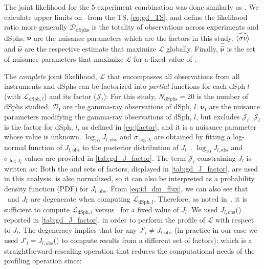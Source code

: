 The joint likelihood for the 5-experiment combination was done similarly as .
We calculate upper limits on \sv~from the TS, \cref{eq:gd_TS}, and define the likelihood ratio more generally
\gdLHratio
$\bm{\mathcal{D}_{\mathrm{dSphs}}}$ is the totality of observations across experiments and dSphs.
$\bm{\nu}$ are the nuisance parameters which are the \J factors in this study.
$\widehat{\langle \sigma \mathit{v} \rangle}$ and $\hat{\bm{\nu}}$ are the respective estimate that maximize $\mathcal{L}$ globally.
Finally, $\hat{\hat{\bm{\nu}}}$ is the set of nuisance parameters that maximize $\mathcal{L}$ for a fixed value of \sv.

The \textit{complete} joint likelihood, $\mathcal{L}$ that encompasses all observations from all instruments and dSphs can be factorized into \textit{partial} functions for each dSph $l$ (with $\mathcal{L}_{\mathrm{dSph}, l}$) and its \J factor ($\mathcal{J}_l$):
\CompleteGDLLH
For this study, $N_{\mathrm{dSphs}}=20$ is the number of dSphs studied.
$\bm{\mathcal{D}_{l}}$ are the gamma-ray observations of dSph, $l$.
$\bm{\nu_l}$ are the nuisance parameters modifying the gamma-ray observations of dSph, $l$, but excludes $\mathcal{J}_l$.
$\mathcal{J}_l$ is the \J factor for dSph, $l$, as defined in \cref{eq:jfactor}, and it is a nuisance parameter whose value is unknown.
$\log_{10} J_{l,\mathrm{obs}}$ and $\sigma_{\log{J_l}}$ are obtained by fitting a log-normal function of $J_{l,\mathrm{obs}}$ to the posterior distribution of $J_{l}$~\cite{2015PhRvL.115w1301A}.
$\log_{10} J_{l,\mathrm{obs}}$ and $\sigma_{\log{J_l}}$ values are provided in \cref{tab:gd_J_factor}.
The term $\mathcal{J}_l$ constraining $J_l$ is written as:
\JLgdLLH
Both the \GS and \B sets of \J factors, displayed in \cref{tab:gd_J_factor}, are used in this analysis.
 is also normalized, so it can also be interpreted as a probability density function (PDF) for $J_{l,\mathrm{obs}}$.
From \cref{eq:id_dm_flux}, we can also see that \sv~and $J_l$ are degenerate when computing $\mathcal{L}_{\mathrm{dSph},l}$.
Therefore, as noted in~\cite{MAGICFermi_combo}, it is sufficient to compute $\mathcal{L}_{\mathrm{dSph},l}$ versus \sv~for a fixed value of $J_{l}$.
We used $J_{l,\mathrm{obs}}$(\GS) reported in \cref{tab:gd_J_factor}, in order to perform the profile of $\mathcal{L}$ with respect to $J_l$.
The degeneracy implies that for any $J'_l \neq J_{l,\mathrm{obs}}$ (in practice in our case we used $J'_l = J_{l,\mathrm{obs}}$(\B) to compute results from a different set of \J factors):
\jfacTrick
which is a straightforward rescaling operation that reduces the computational needs of the profiling operation since:
